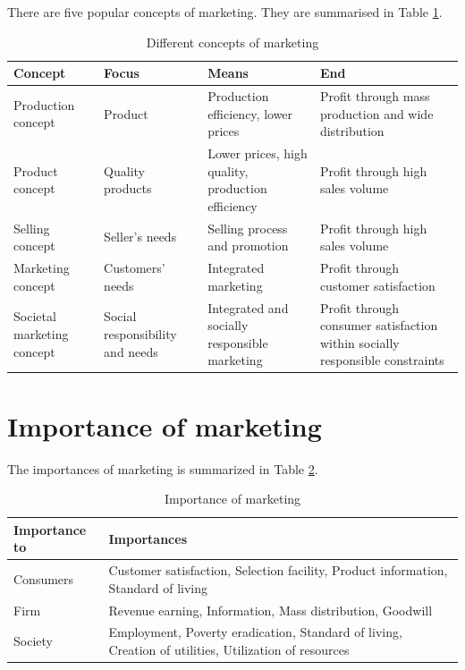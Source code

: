 \documentclass[11pt,]{book}
\theoremstyle{definition}
\theoremstyle{definition}
\theoremstyle{definition}
\theoremstyle{remark}
\begin{document}
There are five popular concepts of marketing. They are summarised in
Table \ref{tab:marketing-fives}.

\begin{table}[H]

\caption{\label{tab:marketing-fives}Different concepts of marketing}
\centering
\begin{tabular}[t]{>{\raggedright\arraybackslash}p{3.2cm}>{\raggedright\arraybackslash}p{3.6cm}>{\raggedright\arraybackslash}p{3.6cm}>{\raggedright\arraybackslash}p{3.6cm}}
\toprule
\textbf{Concept} & \textbf{Focus} & \textbf{Means} & \textbf{End}\\
\midrule
Production concept & Product & Production efficiency, lower prices & Profit through mass production and wide distribution\\
Product concept & Quality products & Lower prices, high quality, production efficiency & Profit through high sales volume\\
Selling concept & Seller's needs & Selling process and promotion & Profit through high sales volume\\
Marketing concept & Customers' needs & Integrated marketing & Profit through customer satisfaction\\
Societal marketing concept & Social responsibility and needs & Integrated and socially responsible marketing & Profit through consumer satisfaction within socially responsible constraints\\
\bottomrule
\end{tabular}
\end{table}

\section{Importance of marketing}\label{importance-of-marketing}

The importances of marketing is summarized in Table
\ref{tab:marketing-importance}.

\begin{table}[H]

\caption{\label{tab:marketing-importance}Importance of marketing}
\centering
\begin{tabular}[t]{>{\raggedright\arraybackslash}p{4cm}>{\raggedright\arraybackslash}p{10cm}}
\toprule
\textbf{Importance to} & \textbf{Importances}\\
\midrule
Consumers & Customer satisfaction, Selection facility, Product information, Standard of living\\
Firm & Revenue earning, Information, Mass distribution, Goodwill\\
Society & Employment, Poverty eradication, Standard of living, Creation of utilities, Utilization of resources\\
\bottomrule
\end{tabular}
\end{table}
\end{document}
